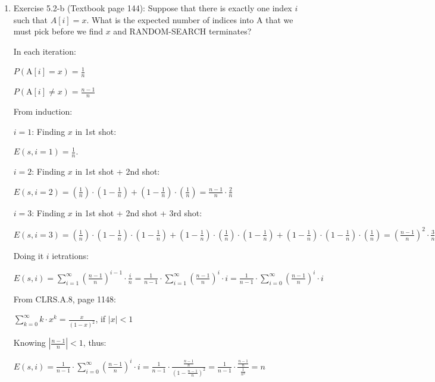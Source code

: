 \documentclass[11pt]{article}
\begin{document}
\begin{enumerate}

\itemsep 0.35in


\item Exercise 5.2-b (Textbook page 144): Suppose that there is exactly one index $i$ such that $A[i] =x$. What is the expected number of indices into A that we must pick before we find $x$ and RANDOM-SEARCH terminates?
	
	In each iteration:
	
	\hspace{10mm} $P(\mathrm{A}[i]=x) = \frac{1}{n}$
	
	\hspace{10mm} $P(\mathrm{A}[i]\neq x) = \frac{n-1}{n}$

	From induction:
	
	$i=1$: Finding $x$ in  1st shot:
	
	\hspace{10mm} $E(s,i=1) = \frac{1}{n}$. 

	$i=2$: Finding $x$ in 1st shot + 2nd shot:
	
	\hspace{10mm} $E(s,i=2) = (\frac{1}{n})\cdot(1-\frac{1}{n}) + (1-\frac{1}{n}) \cdot (\frac{1}{n}) =
				\frac{n-1}{n} \cdot \frac{2}{n} $
		
	$i=3$: Finding $x$ in 1st shot + 2nd shot + 3rd shot:
	
	\hspace{10mm} $E(s,i=3) =  (\frac{1}{n}) \cdot (1-\frac{1}{n}) \cdot (1-\frac{1}{n})  + (1-\frac{1}{n}) \cdot (\frac{1}{n}) \cdot (1-\frac{1}{n}) + (1-\frac{1}{n}) \cdot (1-\frac{1}{n}) \cdot (\frac{1}{n}) = 
	(\frac{n-1}{n})^{2} \cdot \frac{3}{n} $

	
	Doing it $i$ ietrations:
	
	\hspace{10mm} $E(s,i) = \sum_{i=1}^{\infty} (\frac{n-1}{n})^{i-1}\cdot\frac{i}{n}=
	 \frac{1}{n-1} \cdot \sum_{i=1}^{\infty} (\frac{n-1}{n})^{i}\cdot i= 
	 \frac{1}{n-1} \cdot \sum_{i=0}^{\infty} (\frac{n-1}{n})^{i}\cdot i$
	
	From CLRS.A.8, page 1148:
	
	\hspace{10mm} $\sum_{k=0}^{\infty} k\cdot x^{k}=\frac{x}{(1-x)^{2}}$, if $|x|<1$	
	
	Knowing $|\frac{n-1}{n}|<1$, thus:
	
	\hspace{10mm} $E(s,i) = \frac{1}{n-1} \cdot \sum_{i=0}^{\infty} (\frac{n-1}{n})^{i}\cdot i = 
	\frac{1}{n-1} \cdot \frac{\frac{n-1}{n}}{(1-\frac{n-1}{n})^{2}} = 
	\frac{1}{n-1} \cdot \frac{\frac{n-1}{n}}{\frac{1}{n^{2}}}=n$
	 

\end{enumerate}
\end{document}
